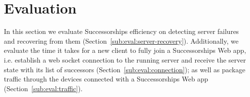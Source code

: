 \section{Evaluation}
\label{sec:evaluation}

In this section we evaluate Successorships efficiency on detecting server failures and recovering from them (Section~\ref{sub:eval:server-recovery}).
Additionally, we evaluate the time it takes for a new client to fully join a Successorships Web app, i.e. establish a web socket connection to the running server and receive the server state with its list of successors (Section~\ref{sub:eval:connection}); as well as package traffic through the devices connected with a Successorships Web app (Section~\ref{sub:eval:traffic}).









